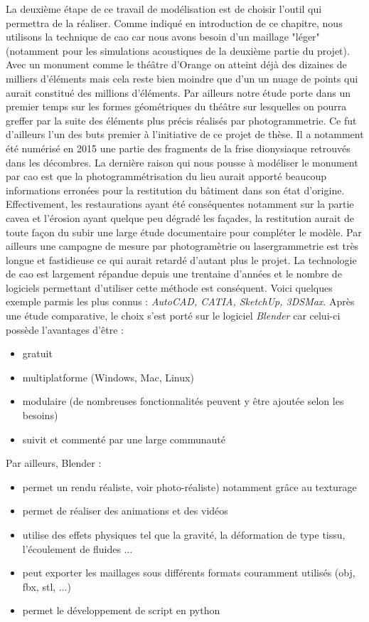La deuxième étape de ce travail de modélisation est de choisir l'outil qui permettra de la réaliser. Comme indiqué en introduction de ce chapitre, nous utilisons la technique de \gls{cao} car nous avons besoin d'un maillage "léger" (notamment pour les simulations acoustiques de la deuxième partie du projet). Avec un monument comme le théâtre d'Orange on atteint déjà des dizaines de milliers d'éléments mais cela reste bien moindre que d'un un nuage de points qui aurait constitué des millions d'éléments. Par ailleurs notre étude porte dans un premier temps sur les formes géométriques du théâtre sur lesquelles on pourra greffer par la suite des éléments plus précis réalisés par photogrammetrie. Ce fut d'ailleurs l'un des buts premier à l'initiative de ce projet de thèse. Il a notamment été numérisé en 2015 une partie des fragments de la frise dionysiaque retrouvés dans les décombres. La dernière raison qui nous pousse à modéliser le monument par \gls{cao} est que la photogrammétrisation du lieu aurait apporté beaucoup informations erronées pour la restitution du bâtiment dans son état d'origine. Effectivement, les restaurations ayant été conséquentes notamment sur la partie cavea et l'érosion ayant quelque peu dégradé les façades, la restitution aurait de toute façon du subir une large étude documentaire pour compléter le modèle. Par ailleurs une campagne de mesure par photogramètrie ou lasergrammetrie est très longue et fastidieuse ce qui aurait retardé d'autant plus le projet. La technologie de \gls{cao} est largement répandue depuis une trentaine d'années et le nombre de logiciels permettant d'utiliser cette méthode est conséquent. Voici quelques exemple parmis les plus connus : \textit{AutoCAD, CATIA, SketchUp, 3DSMax}. Après une étude comparative, le choix s'est porté sur le logiciel \textit{Blender} car celui-ci possède l'avantages d'être :

\begin{itemize}
	\item gratuit
	\item multiplatforme (Windows, Mac, Linux)
	\item modulaire (de nombreuses fonctionnalités peuvent y être ajoutée selon les besoins)
	\item suivit et commenté par une large communauté
\end{itemize}

Par ailleurs, Blender : 
\begin{itemize}
	\item permet un rendu réaliste, voir photo-réaliste) notamment grâce au texturage
	\item permet de réaliser des animations et des vidéos
	\item utilise des effets physiques tel que la gravité, la déformation de type tissu, l'écoulement de fluides ...
	\item peut exporter les maillages sous différents formats couramment utilisés (obj, fbx, stl, ...)
	\item permet le développement de script en python
\end{itemize}

